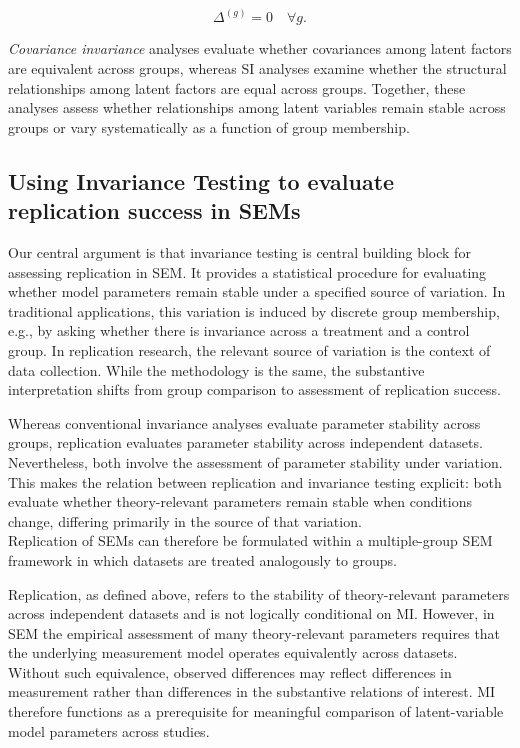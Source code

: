 \documentclass[
  12pt,
  letterpaper,
  man]{apa7}
\begin{document}
\[ \Delta^{(g)} = 0 \quad \forall g. \]

\emph{Covariance invariance} analyses evaluate whether covariances among
latent factors are equivalent across groups, whereas SI analyses examine
whether the structural relationships among latent factors are equal
across groups. Together, these analyses assess whether relationships
among latent variables remain stable across groups or vary
systematically as a function of group membership.

\subsection{Using Invariance Testing to evaluate replication success in
SEMs}\label{using-invariance-testing-to-evaluate-replication-success-in-sems}

Our central argument is that invariance testing is central building
block for assessing replication in SEM. It provides a statistical
procedure for evaluating whether model parameters remain stable under a
specified source of variation. In traditional applications, this
variation is induced by discrete group membership, e.g., by asking
whether there is invariance across a treatment and a control group. In
replication research, the relevant source of variation is the context of
data collection. While the methodology is the same, the substantive
interpretation shifts from group comparison to assessment of replication
success.

Whereas conventional invariance analyses evaluate parameter stability
across groups, replication evaluates parameter stability across
independent datasets. Nevertheless, both involve the assessment of
parameter stability under variation. This makes the relation between
replication and invariance testing explicit: both evaluate whether
theory-relevant parameters remain stable when conditions change,
differing primarily in the source of that variation.\\
Replication of SEMs can therefore be formulated within a multiple-group
SEM framework in which datasets are treated analogously to groups.

Replication, as defined above, refers to the stability of
theory-relevant parameters across independent datasets and is not
logically conditional on MI. However, in SEM the empirical assessment of
many theory-relevant parameters requires that the underlying measurement
model operates equivalently across datasets. Without such equivalence,
observed differences may reflect differences in measurement rather than
differences in the substantive relations of interest. MI therefore
functions as a prerequisite for meaningful comparison of latent-variable
model parameters across studies.
\end{document}
